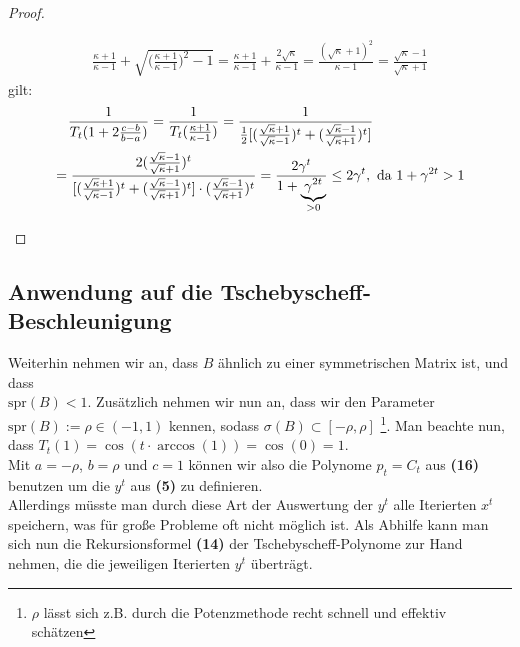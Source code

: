 \documentclass[12pt,a4paper,numbers=endperiod]{scrartcl}
\theoremstyle{definition}
\newcommand{\spr}{\text{spr}}
\begin{document}
\begin{proof}
\begin{enumerate}
	 \begin{align*}
	  	\frac{\kappa +1}{\kappa -1} + \sqrt{\bigg(\frac{\kappa +1}{\kappa -1}\bigg)^2 -1} = \frac{\kappa +1}{\kappa -1} + \frac{2\sqrt{\kappa}}{\kappa -1} = \frac{(\sqrt{\kappa}+1)^2}{\kappa-1} = \frac{\sqrt{\kappa}-1}{\sqrt{\kappa} +1}
	 \end{align*}
	 gilt:
	 \begin{equation}
	 \begin{gathered}
	 	\frac{1}{T_t(1 + 2 \frac{c-b}{b-a})} = \frac{1}{T_t(\frac{\kappa +1}{\kappa -1})} = \frac{1}{\frac{1}{2} [(\frac{\sqrt{\kappa} +1}{\sqrt{\kappa} -1})^t + (\frac{\sqrt{\kappa} -1}{\sqrt{\kappa} +1})^t]} \hspace{20mm}\\
	 	 = \frac{2 (\frac{\sqrt{\kappa} -1}{\sqrt{\kappa} +1})^t}{[(\frac{\sqrt{\kappa} +1}{\sqrt{\kappa} -1})^t + (\frac{\sqrt{\kappa} -1}{\sqrt{\kappa} +1})^t] \cdot (\frac{\sqrt{\kappa} -1}{\sqrt{\kappa} +1})^t} = \frac{2 \gamma^t}{1+ \underbrace{\gamma^{2t}}_{>0}} \leq 2 \gamma^t, \text{ da } 1+ \gamma^{2t} >1
	 \end{gathered}
	 \end{equation}
	 \end{enumerate} 
\end{proof}

\subsection{Anwendung auf die Tschebyscheff-Beschleunigung} 

Weiterhin nehmen wir an, dass $B$ ähnlich zu einer symmetrischen Matrix ist, und dass\\
$\spr(B) < 1$. Zusätzlich nehmen wir nun an, dass wir den Parameter $\spr(B) := \rho \in (-1,1)$ kennen, sodass $\sigma(B) \subset [-\rho, \rho]$ \footnote{$\rho$ lässt sich z.B. durch die Potenzmethode recht schnell und effektiv schätzen}. 
Man beachte nun, dass $T_t(1) = \cos(t \cdot \arccos(1)) = \cos(0) = 1$.\\
Mit $a = -\rho$, $b = \rho$ und $c = 1$ können wir also die Polynome $p_t = C_t$ aus \textbf{(16)} benutzen um die $y^t$ aus \textbf{(5)} zu definieren.\\

Allerdings müsste man durch diese Art der Auswertung der $y^t$ alle Iterierten $x^t$ speichern, was für große Probleme oft nicht möglich ist. Als Abhilfe kann man sich nun die Rekursionsformel \textbf{(14)} der Tschebyscheff-Polynome zur Hand nehmen, die die jeweiligen Iterierten $y^t$ überträgt.\\
\end{document}
